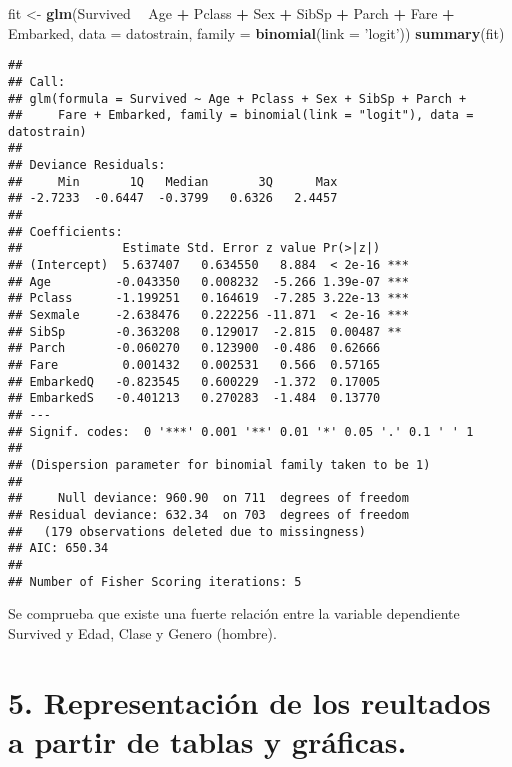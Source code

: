 \documentclass[]{article}
\newenvironment{Shaded}{\begin{snugshade}}{\end{snugshade}}
\newcommand{\KeywordTok}[1]{\textcolor[rgb]{0.13,0.29,0.53}{\textbf{#1}}}
\newcommand{\DataTypeTok}[1]{\textcolor[rgb]{0.13,0.29,0.53}{#1}}
\newcommand{\StringTok}[1]{\textcolor[rgb]{0.31,0.60,0.02}{#1}}
\newcommand{\OperatorTok}[1]{\textcolor[rgb]{0.81,0.36,0.00}{\textbf{#1}}}
\newcommand{\NormalTok}[1]{#1}
\begin{document}
\begin{Shaded}
\begin{Highlighting}[]
\NormalTok{fit <-}\StringTok{ }\KeywordTok{glm}\NormalTok{(Survived }\OperatorTok{~}\StringTok{ }\NormalTok{Age }\OperatorTok{+}\StringTok{ }\NormalTok{Pclass }\OperatorTok{+}\StringTok{ }\NormalTok{Sex }\OperatorTok{+}\StringTok{ }\NormalTok{SibSp }\OperatorTok{+}\StringTok{ }\NormalTok{Parch }\OperatorTok{+}\StringTok{ }\NormalTok{Fare }\OperatorTok{+}\StringTok{ }\NormalTok{Embarked, }
           \DataTypeTok{data =}\NormalTok{ datostrain, }\DataTypeTok{family =} \KeywordTok{binomial}\NormalTok{(}\DataTypeTok{link =} \StringTok{'logit'}\NormalTok{))}
\KeywordTok{summary}\NormalTok{(fit)}
\end{Highlighting}
\end{Shaded}

\begin{verbatim}
## 
## Call:
## glm(formula = Survived ~ Age + Pclass + Sex + SibSp + Parch + 
##     Fare + Embarked, family = binomial(link = "logit"), data = datostrain)
## 
## Deviance Residuals: 
##     Min       1Q   Median       3Q      Max  
## -2.7233  -0.6447  -0.3799   0.6326   2.4457  
## 
## Coefficients:
##              Estimate Std. Error z value Pr(>|z|)    
## (Intercept)  5.637407   0.634550   8.884  < 2e-16 ***
## Age         -0.043350   0.008232  -5.266 1.39e-07 ***
## Pclass      -1.199251   0.164619  -7.285 3.22e-13 ***
## Sexmale     -2.638476   0.222256 -11.871  < 2e-16 ***
## SibSp       -0.363208   0.129017  -2.815  0.00487 ** 
## Parch       -0.060270   0.123900  -0.486  0.62666    
## Fare         0.001432   0.002531   0.566  0.57165    
## EmbarkedQ   -0.823545   0.600229  -1.372  0.17005    
## EmbarkedS   -0.401213   0.270283  -1.484  0.13770    
## ---
## Signif. codes:  0 '***' 0.001 '**' 0.01 '*' 0.05 '.' 0.1 ' ' 1
## 
## (Dispersion parameter for binomial family taken to be 1)
## 
##     Null deviance: 960.90  on 711  degrees of freedom
## Residual deviance: 632.34  on 703  degrees of freedom
##   (179 observations deleted due to missingness)
## AIC: 650.34
## 
## Number of Fisher Scoring iterations: 5
\end{verbatim}

Se comprueba que existe una fuerte relación entre la variable
dependiente Survived y Edad, Clase y Genero (hombre).

\section{5. Representación de los reultados a partir de tablas y
gráficas.}\label{representacion-de-los-reultados-a-partir-de-tablas-y-graficas.}
\end{document}
